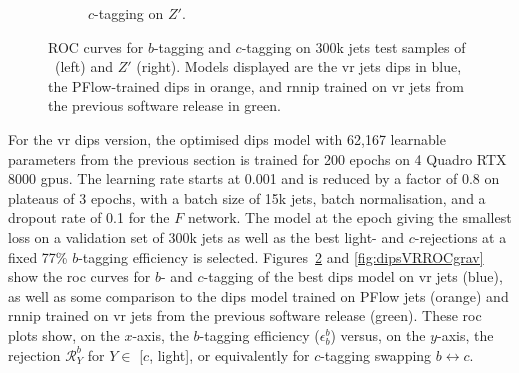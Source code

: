 \begin{figure}[h!]
\begin{subfigure}[t]{0.48\textwidth}
    \caption{$c$-tagging on $Z'$.}
    \label{fig:dipsVRROCzpc}
  \end{subfigure}
  \caption{ROC curves for $b$-tagging and $c$-tagging on 300k jets test samples of \ttb\ (left) and $Z'$ (right). Models displayed are the \gls{vr} jets \gls{dips} in blue, the PFlow-trained \gls{dips} in orange, and \gls{rnnip} trained on \gls{vr} jets from the previous software release in green.}
  \label{fig:dipsVRROC}
\end{figure}

For the \gls{vr} \gls{dips} version, the optimised \gls{dips} model with 62,167 learnable parameters from the previous section is trained for 200 epochs on 4 Quadro RTX 8000 \glspl{gpu}. The learning rate starts at 0.001 and is reduced by a factor of 0.8 on plateaus of 3 epochs, with a batch size of 15k jets, batch normalisation, and a dropout rate of 0.1 for the $F$ network. The model at the epoch giving the smallest loss on a validation set of 300k jets as well as the best light- and $c$-rejections at a fixed 77\% $b$-tagging efficiency is selected. Figures~\ref{fig:dipsVRROC} and \ref{fig:dipsVRROCgrav} show the \gls{roc} curves for $b$- and $c$-tagging of the best \gls{dips} model on \gls{vr} jets (blue), as well as some comparison to the \gls{dips} model trained on PFlow jets (orange) and \gls{rnnip} trained on \gls{vr} jets from the previous software release (green). These \gls{roc} plots show, on the $x$-axis, the $b$-tagging efficiency ($\epsilon^b_b$) versus, on the $y$-axis, the rejection $\mathcal{R}^b_Y$ for $Y \in$ [$c$, light], or equivalently for $c$-tagging swapping $b \leftrightarrow c$.\\


